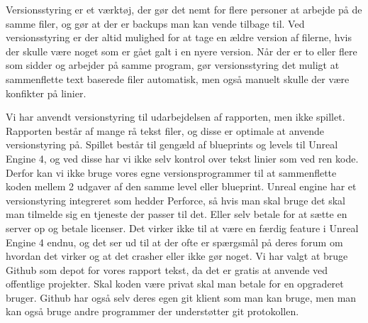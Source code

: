 





Versionsstyring er et værktøj, der gør det nemt for flere personer at arbejde på de samme filer, og gør at der er backups man kan vende tilbage til. Ved versionsstyring er der altid mulighed for at tage en ældre version af filerne, hvis der skulle være
noget som er gået galt i en nyere version. Når der er to eller flere som sidder og arbejder på samme program, gør versionsstyring det muligt at sammenflette text baserede filer automatisk, men også manuelt skulle der være konfikter på linier.

Vi har anvendt versionstyring til udarbejdelsen af rapporten, men ikke spillet. Rapporten består af mange rå tekst filer, og disse er optimale at anvende versionstyring på. Spillet består til gengæld af blueprints og levels til Unreal Engine 4, og ved disse har vi ikke selv kontrol over tekst linier som ved ren kode. Derfor kan vi ikke bruge vores egne versionsprogrammer til at sammenflette koden mellem 2 udgaver af den samme level eller blueprint. Unreal engine har et versionstyring integreret som hedder Perforce, så hvis man skal bruge det skal man tilmelde sig en tjeneste der passer til det. Eller selv betale for at sætte en server op og betale licenser. Det virker ikke til at være en færdig feature i Unreal Engine 4 endnu, og det ser ud til at der ofte er spærgsmål på deres forum om hvordan det virker og at det crasher eller ikke gør noget\cite{blueprintmerge}.
Vi har valgt at bruge Github som depot for vores rapport tekst, da det er gratis at anvende ved offentlige projekter. Skal koden være privat skal man betale for en opgraderet bruger\cite{githubterms}. Github har også selv deres egen git klient som man kan bruge, men man kan også bruge andre programmer der understøtter git protokollen.


